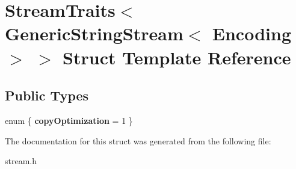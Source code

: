 \hypertarget{a02420}{}\section{Stream\+Traits$<$ Generic\+String\+Stream$<$ Encoding $>$ $>$ Struct Template Reference}
\label{a02420}
\subsection*{Public Types}
\begin{DoxyCompactItemize}
\item 
\mbox{\label{a02420_ac76bff6668c9e5f2a5929c5ca81c73e9}} 
enum \{ {\bfseries copy\+Optimization} = 1
 \}
\end{DoxyCompactItemize}


The documentation for this struct was generated from the following file\+:\begin{DoxyCompactItemize}
\item 
stream.\+h\end{DoxyCompactItemize}
